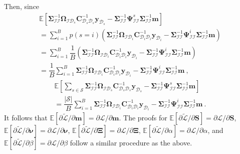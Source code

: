 \documentclass[conference]{IEEEtran}
\begin{document}
	Then, since
	\begin{equation*}
		\begin{array}{l}
			\displaystyle\mathbb{E}[ \mathbf{\Sigma}_\mathcal{II}^{-1}\mathbf{\Omega}_{\mathcal{I}\mathcal{D}_s}\mathbf{C}_{\mathcal{D}_s\mathcal{D}_s}^{-1}\mathbf{y}_{\mathcal{D}_s}-\mathbf{\Sigma}_\mathcal{II}^{-1}\mathbf{\Psi}_\mathcal{II}^{s}\mathbf{\Sigma}_\mathcal{II}^{-1}\mathbf{m}] \\
			\displaystyle=\sum_{i=1}^{B}p(s=i)(\mathbf{\Sigma}_\mathcal{II}^{-1}\mathbf{\Omega}_{\mathcal{I}\mathcal{D}_i}\mathbf{C}_{\mathcal{D}_i\mathcal{D}_i}^{-1}\mathbf{y}_{\mathcal{D}_i}-\mathbf{\Sigma}_\mathcal{II}^{-1}\mathbf{\Psi}_\mathcal{II}^{i}\mathbf{\Sigma}_\mathcal{II}^{-1}\mathbf{m}) \\
			\displaystyle=\sum_{i=1}^{B}\dfrac{1}{B}(\mathbf{\Sigma}_\mathcal{II}^{-1}\mathbf{\Omega}_{\mathcal{I}\mathcal{D}_i}\mathbf{C}_{\mathcal{D}_i\mathcal{D}_i}^{-1}\mathbf{y}_{\mathcal{D}_i}-\mathbf{\Sigma}_\mathcal{II}^{-1}\mathbf{\Psi}_\mathcal{II}^{i}\mathbf{\Sigma}_\mathcal{II}^{-1}\mathbf{m}) \\
			\displaystyle=\dfrac{1}{B}\sum_{i=1}^{B}\mathbf{\Sigma}_\mathcal{II}^{-1}\mathbf{\Omega}_{\mathcal{I}\mathcal{D}_i}\mathbf{C}_{\mathcal{D}_i\mathcal{D}_i}^{-1}\mathbf{y}_{\mathcal{D}_i}-\mathbf{\Sigma}_\mathcal{II}^{-1}\mathbf{\Psi}_\mathcal{II}^{i}\mathbf{\Sigma}_\mathcal{II}^{-1}\mathbf{m}\ ,
		\end{array}
	\end{equation*}
	\begin{equation*}
		\begin{array}{l}
			\displaystyle\mathbb{E}\left[\sum_{s\in\mathcal{S}} \mathbf{\Sigma}_\mathcal{II}^{-1}\mathbf{\Omega}_{\mathcal{I}\mathcal{D}_s}\mathbf{C}_{\mathcal{D}_s\mathcal{D}_s}^{-1}\mathbf{y}_{\mathcal{D}_s}-\mathbf{\Sigma}_\mathcal{II}^{-1}\mathbf{\Psi}_\mathcal{II}^{s}\mathbf{\Sigma}_\mathcal{II}^{-1}\mathbf{m}\right]\\
			\displaystyle=\dfrac{|\mathcal{S}|}{B}\sum_{i=1}^{B}\mathbf{\Sigma}_\mathcal{II}^{-1}\mathbf{\Omega}_{\mathcal{I}\mathcal{D}_i}\mathbf{C}_{\mathcal{D}_i\mathcal{D}_i}^{-1}\mathbf{y}_{\mathcal{D}_i}-\mathbf{\Sigma}_\mathcal{II}^{-1}\mathbf{\Psi}_\mathcal{II}^{i}\mathbf{\Sigma}_\mathcal{II}^{-1}\mathbf{m}\ .
		\end{array}
	\end{equation*}
	It follows that $\mathbb{E}[\partial\widetilde{\mathcal{L}}/\partial\mathbf{m}]=\partial{\mathcal{L}}/\partial\mathbf{m}$. The proofs for $\mathbb{E}[\partial\widetilde{\mathcal{L}}/\partial\mathbf{S}]=\partial{\mathcal{L}}/\partial\mathbf{S}$, 
	$\mathbb{E}[\partial\widetilde{\mathcal{L}}/\partial\boldsymbol{\nu}]=\partial{\mathcal{L}}/\partial\boldsymbol{\nu}$, 
	$\mathbb{E}[\partial\widetilde{\mathcal{L}}/\partial\mathbf{\Xi}]=\partial{\mathcal{L}}/\partial\mathbf{\Xi}$, 	$\mathbb{E}[\partial\widetilde{\mathcal{L}}/\partial   \alpha]=\partial{\mathcal{L}}/\partial \alpha$, and $\mathbb{E}[\partial\widetilde{\mathcal{L}}/\partial \beta]=\partial{\mathcal{L}}/\partial \beta$ follow a similar procedure as the above.
\end{document}

